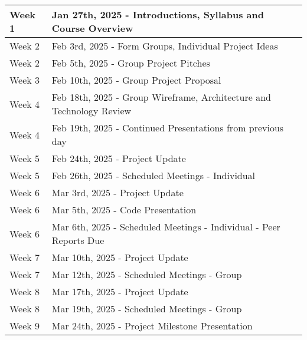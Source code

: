 \renewcommand{\arraystretch}{1.5}




\begin{tabular}{ | l | l |  }
    \hline
    Week 1 & Jan 27th, 2025 - Introductions, Syllabus and Course Overview \\
    \hline
    Week 2 & Feb 3rd, 2025 - Form Groups, Individual Project Ideas \\ 
    \hline
    Week 2 & Feb 5th, 2025 - Group Project Pitches  \\ 
    \hline
    Week 3 & Feb 10th, 2025 - Group Project Proposal \\ 
    \hline
    Week 4 & Feb 18th, 2025 - Group Wireframe, Architecture and Technology Review \\
    \hline
    Week 4 & Feb 19th, 2025 - Continued Presentations from previous day \\ %
    \hline
    Week 5 & Feb 24th, 2025 - Project Update \\ 
    \hline
    Week 5 & Feb 26th, 2025 - Scheduled Meetings - Individual \\ 
    \hline
    Week 6 & Mar 3rd, 2025 - Project Update \\ 
    \hline
    Week 6 & Mar 5th, 2025 - Code Presentation \\
    \hline
    Week 6 & Mar 6th, 2025 - Scheduled Meetings - Individual - Peer Reports Due \\ %
    \hline
    Week 7 & Mar 10th, 2025 - Project Update \\ 
    \hline
    Week 7 & Mar 12th, 2025 - Scheduled Meetings - Group \\ 
    \hline
    Week 8 & Mar 17th, 2025 - Project Update \\ 
    \hline
    Week 8 & Mar 19th, 2025 - Scheduled Meetings - Group \\ 
    \hline
    Week 9 & Mar 24th, 2025 - Project Milestone Presentation \\ 

\end{tabular}
